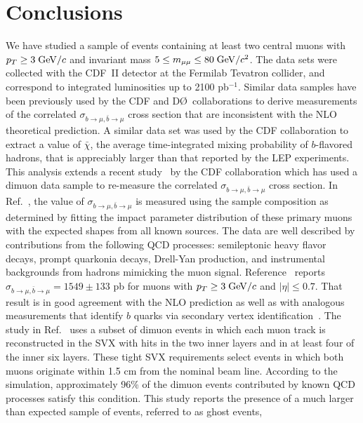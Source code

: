 \documentclass[aps,prd,preprint,floatfix,nofootinbib,superscriptaddress,showpacs,amssymb]{revtex4}
\begin{document}
\section{Conclusions}\label{sec:ss-concl} 
 We have studied a sample of events containing at least two central muons
 with $p_T \geq 3 \; {\rm GeV/}c$ and invariant mass
 $5 \leq m_{\mu\mu} \leq 80 \; {\rm GeV/}c^2$. The data sets were collected with
 the CDF~II detector at the Fermilab Tevatron collider, and correspond to
 integrated luminosities up to 2100 pb$^{-1}$. Similar data samples have
 been previously used by the CDF and D\O~collaborations to derive measurements
 of the correlated $\sigma_{b\rightarrow\mu,\bar{b}\rightarrow \mu}$ cross
 section that are inconsistent with the NLO theoretical prediction.
 A similar data set was used by the CDF collaboration to extract a value
 of $\bar{\chi}$, the average time-integrated mixing probability of
 $b$-flavored hadrons, that is appreciably larger than that reported
 by the LEP experiments. This analysis extends a recent study~\cite{bbxs}
 by the CDF collaboration which has used a dimuon data sample to
 re-measure the correlated $\sigma_{b\rightarrow\mu,\bar{b}\rightarrow \mu}$
 cross section. In Ref.~\cite{bbxs}, the value of 
 $\sigma_{b\rightarrow\mu,\bar{b}\rightarrow \mu}$ is measured using the
 sample composition as determined by fitting the impact parameter distribution
 of these primary muons with the expected shapes from all known sources. 
 The data are well described by contributions from the following QCD
 processes: semileptonic heavy flavor decays, prompt quarkonia decays,
 Drell-Yan production, and instrumental backgrounds from hadrons mimicking
 the muon signal. Reference~\cite{bbxs} reports 
 $\sigma_{b\rightarrow\mu,\bar{b}\rightarrow \mu}= 1549 \pm 133$ pb
 for muons with $p_T \geq 3 \; {\rm GeV/}c$ and $|\eta| \leq 0.7$.
 That result is in good agreement with the NLO prediction as well as
 with analogous measurements that identify $b$ quarks via secondary vertex
 identification~\cite{ajets,shears}. The study in Ref.~\cite{bbxs}
 uses a subset of dimuon events in which each muon track is reconstructed
 in the SVX with hits in the two inner layers and in at least four of the
 inner six layers. These tight SVX requirements select events in which both
 muons originate within 1.5 cm from the nominal beam line. According to the
 simulation, approximately 96\% of the dimuon events contributed by known
 QCD processes satisfy this condition. This study reports the presence of
 a much larger than expected sample of events, referred to as ghost events,
\end{document}
